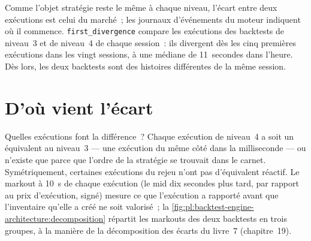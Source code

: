 \begin{omfigure}

\label{fig:pl:backtest-engine-architecture:sessions}
\end{omfigure}

Comme l'objet stratégie reste le même à chaque niveau, l'écart entre deux exécutions est celui du marché~; les
journaux d'événements du moteur indiquent où il commence. \texttt{first\_divergence} compare les exécutions des backtests de niveau~3 et de niveau~4 de chaque session~: ils
divergent dès les cinq premières exécutions dans les vingt sessions, à une médiane de 11~secondes dans l'heure. Dès lors, les deux backtests sont des histoires différentes de
la même session.

\section{D'où vient l'écart}

Quelles exécutions font la différence~? Chaque exécution de niveau~4 a soit un équivalent au niveau~3 --- une exécution du même côté dans la milliseconde ---
ou n'existe que parce que l'ordre de la stratégie se trouvait dans le carnet. Symétriquement, certaines exécutions du rejeu n'ont pas d'équivalent réactif. Le
markout à 10~s de chaque exécution (le mid dix secondes plus tard, par rapport au prix d'exécution, signé) mesure ce que l'exécution a rapporté avant que
l'inventaire qu'elle a créé ne soit valorisé~; la \cref{fig:pl:backtest-engine-architecture:decomposition} répartit les markouts des deux backtests en trois
groupes, à la manière de la décomposition des écarts du livre~7 (chapitre~19).

